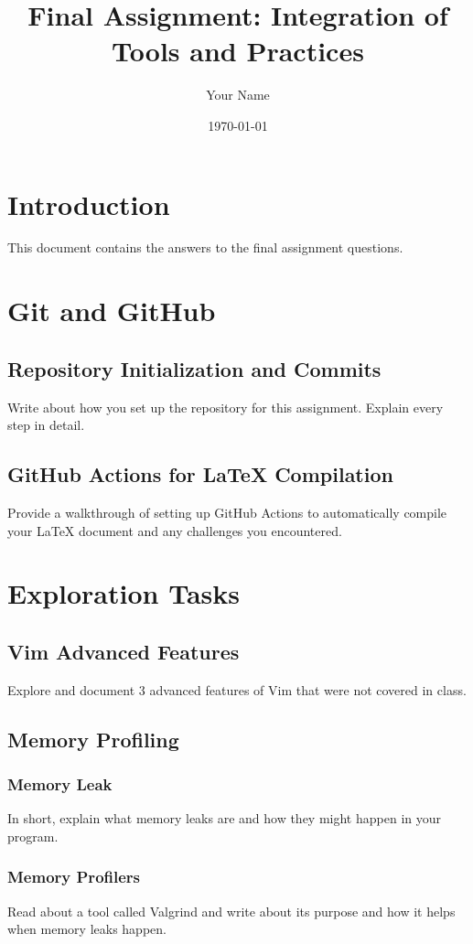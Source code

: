 \documentclass{article}
\title{Final Assignment: Integration of Tools and Practices}
\author{Your Name}
\date{\today}
\begin{document}
\maketitle
\tableofcontents

\section{Introduction}
This document contains the answers to the final assignment questions.

\section{Git and GitHub}
\subsection{Repository Initialization and Commits}
Write about how you set up the repository for this assignment. Explain every step in detail.

\subsection{GitHub Actions for LaTeX Compilation}
Provide a walkthrough of setting up GitHub Actions to automatically compile your LaTeX document and any challenges you encountered.

\section{Exploration Tasks}
\subsection{Vim Advanced Features}
Explore and document 3 advanced features of Vim that were not covered in class.

\subsection{Memory Profiling}
\subsubsection{Memory Leak}
In short, explain what memory leaks are and how they might happen in your program.

\subsubsection{Memory Profilers}
Read about a tool called Valgrind and write about its purpose and how it helps when memory leaks happen.
\end{document}
